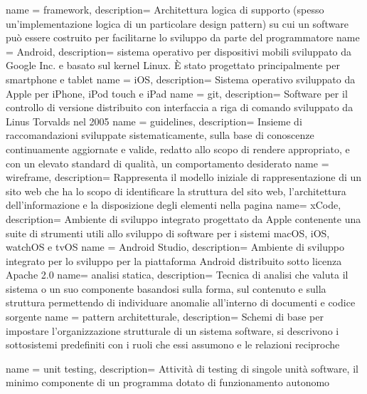  {
  name = framework,
  description={
		Architettura logica di supporto (spesso un’implementazione logica di un particolare design pattern) su cui un software può essere costruito per facilitarne lo sviluppo da parte del programmatore}
}
 {
  name = Android,
  description={
		sistema operativo per dispositivi mobili sviluppato da Google Inc. e basato sul kernel Linux. È stato progettato principalmente per smartphone e tablet}
}
 {
  name = iOS,
  description={
		Sistema operativo sviluppato da Apple per iPhone, iPod touch e iPad}
}
 {
  name = git,
  description={
		Software per il controllo di versione distribuito con interfaccia a riga di comando sviluppato da Linus Torvalds nel 2005}
}
 {
  name = guidelines,
  description={
		  Insieme di raccomandazioni sviluppate sistematicamente, sulla base di conoscenze continuamente aggiornate e valide, redatto allo scopo di rendere appropriato, e con un elevato standard di qualità, un comportamento desiderato}
}
 {
  name = wireframe,
  description={
		Rappresenta il modello iniziale di rappresentazione di un sito web che ha lo scopo di identificare la struttura del sito web, l'architettura dell'informazione e la disposizione degli elementi nella pagina}
}
 {
  name= xCode,
  description={
		Ambiente di sviluppo integrato progettato da Apple contenente una suite di strumenti utili allo sviluppo di software per i sistemi macOS, iOS, watchOS e tvOS}
}
 {
  name = Android Studio,
  description={
		Ambiente di sviluppo integrato per lo sviluppo per la piattaforma Android distribuito sotto licenza Apache 2.0}
}
 {
  name= analisi statica,
  description={
		Tecnica di analisi che valuta il sistema o un suo componente basandosi sulla forma, sul contenuto e sulla struttura permettendo di individuare anomalie all'interno di documenti e codice sorgente}
}
 {
  name = pattern architetturale,
  description={
		Schemi di base per impostare l'organizzazione strutturale di un sistema software, si descrivono i sottosistemi predefiniti con i ruoli che essi assumono e le relazioni reciproche}
}

 {
  name = unit testing,
  description={
		Attività di testing di singole unità software, il minimo componente di un programma dotato di funzionamento autonomo}
}

